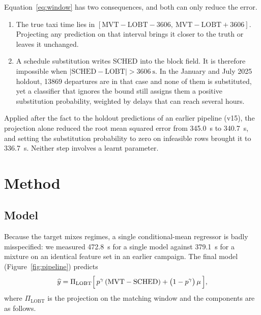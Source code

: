 \documentclass[11pt,a4paper]{article}
\begin{document}
Equation~\eqref{eq:window} has two consequences, and both can only reduce the
error.
\begin{enumerate}
\item The true taxi time lies in
\([\text{MVT} - \text{LOBT} - 3606,\ \text{MVT} - \text{LOBT} + 3606]\).
Projecting any prediction on that interval brings it closer to the truth or
leaves it unchanged.
\item A schedule substitution writes SCHED into the block field. It is
therefore impossible when \(\lvert \text{SCHED} - \text{LOBT} \rvert >
\SI{3606}{\second}\). In the January and July 2025 holdout, \num{13869}
departures are in that case and none of them is substituted, yet a classifier
that ignores the bound still assigns them a positive substitution probability,
weighted by delays that can reach several hours.
\end{enumerate}
Applied after the fact to the holdout predictions of an earlier pipeline (v15),
the projection alone reduced the root mean squared error from
\SI{345.0}{\second} to \SI{340.7}{\second}, and setting the substitution
probability to zero on infeasible rows brought it to \SI{336.7}{\second}.
Neither step involves a learnt parameter.

\section{Method}
\label{sec:method}

\subsection{Model}

Because the target mixes regimes, a single conditional-mean regressor is badly
misspecified: we measured \SI{472.8}{\second} for a single model against
\SI{379.1}{\second} for a mixture on an identical feature set in an earlier
campaign. The final model (Figure~\ref{fig:pipeline}) predicts
\begin{equation}
\widehat{y} = \Pi_{\text{LOBT}}\Bigl[\,p^{\gamma}\,(\text{MVT} - \text{SCHED})
 + \bigl(1 - p^{\gamma}\bigr)\,\mu\,\Bigr],
\label{eq:model}
\end{equation}
where \(\Pi_{\text{LOBT}}\) is the projection on the matching window and the
components are as follows.
\end{document}
